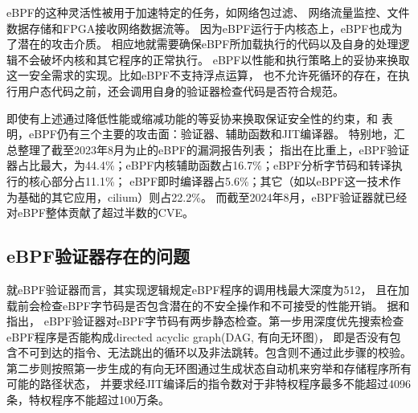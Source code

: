 \documentclass[12pt,a4paper]{article}
\begin{document}
\begin{sloppypar}
\begin{CJK*}{UTF8}{song}
	eBPF的这种灵活性被用于加速特定的任务\cite{HaoValidating}，如网络包过滤\cite{10.1145/3371038,TCPdump}、
	网络流量监控\cite{9110434}、文件数据存储\cite{kernelStorage}和FPGA接收网络数据流\cite{258973}等。
	因为eBPF运行于内核态上，eBPF也成为了潜在的攻击介质\cite{LinuxEbpfProtection}。
	相应地就需要确保eBPF所加载执行的代码以及自身的处理逻辑不会破坏内核和其它程序的正常执行。
	eBPF以性能和执行策略上的妥协来换取这一安全需求的实现。比如eBPF不支持浮点运算\cite{10.1145/3674213.3674219}，
	也不允许死循环的存在\cite{riceLearningEBPFProgramming2023}，在执行用户态代码之前，还会调用自身的验证器检查代码是否符合规范。
	
	即使有上述通过降低性能或缩减功能的等妥协来换取保证安全性的约束，\textcite[62]{FuzzOnEBPF}和
	\textcite{mohamedUnderstandingSecurityLinux2023}表明，eBPF仍有三个主要的攻击面：验证器、辅助函数和JIT编译器。
	特别地，\textcite{mohamedUnderstandingSecurityLinux2023}汇总整理了截至2023年8月为止的eBPF的漏洞报告列表；
	指出在比重上，eBPF验证器占比最大，为44.4\%；eBPF内核辅助函数占16.7\%；eBPF分析字节码和转译执行的核心部分占11.1\%；
	eBPF即时编译器占5.6\%；其它（如以eBPF这一技术作为基础的其它应用，cilium）则占22.2\%。
	而截至2024年8月，eBPF验证器就已经对eBPF整体贡献了超过半数的CVE\cite{hive}。

	\subsection{eBPF验证器存在的问题}
	就eBPF验证器而言，其实现逻辑规定eBPF程序的调用栈最大深度为512\cite[30]{riceLearningEBPFProgramming2023}，
	且在加载前会检查eBPF字节码是否包含潜在的不安全操作和不可接受的性能开销\cite{PKSeBPFIsolation}。
	据\textcite{limSafeBPFHardwareassistedDefenseindepth2024}和\textcite[6]{vieiraFastPacketProcessing2021}指出，
	eBPF验证器对eBPF字节码有两步静态检查。第一步用深度优先搜索检查eBPF程序是否能构成directed acyclic graph(DAG, 有向无环图)，
	即是否没有包含不可到达的指令、无法跳出的循环以及非法跳转。包含则不通过此步骤的校验。
	第二步则按照第一步生成的有向无环图通过生成状态自动机来穷举和存储程序所有可能的路径状态，
	并要求经JIT编译后的指令数对于非特权程序最多不能超过4096条，特权程序不能超过100万条。
	

\end{CJK*}
\end{sloppypar}
\end{document}
